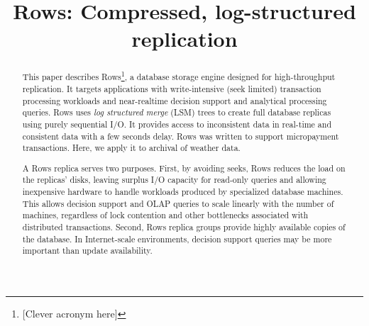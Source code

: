\documentclass{sig-alternate-sigmod08}
\newcommand{\rows}{Rows\xspace}
\begin{document}
%

\title{{\ttlit \rows}: Compressed, log-structured replication}
%
%
\author{}
\maketitle
\begin{abstract}
This paper describes \rows\footnote{[Clever acronym here]}, a database
storage engine designed for high-throughput replication.  It targets
applications with write-intensive (seek limited) transaction
processing workloads and near-realtime decision support and analytical
processing queries.  \rows uses {\em log structured merge} (LSM) trees
to create full database replicas using purely sequential I/O.  It
provides access to inconsistent data in real-time and consistent data
with a few seconds delay.  \rows was written to support micropayment
transactions.  Here, we apply it to archival of weather data.

A \rows replica serves two purposes.  First, by avoiding seeks, \rows
reduces the load on the replicas' disks, leaving surplus I/O capacity
for read-only queries and allowing inexpensive hardware to handle
workloads produced by specialized database machines.  This allows
decision support and OLAP queries to scale linearly with the number of
machines, regardless of lock contention and other bottlenecks
associated with distributed transactions.  Second, \rows replica
groups provide highly available copies of the database.  In
Internet-scale environments, decision support queries may be more
important than update availability.



\end{abstract}
\end{document}
